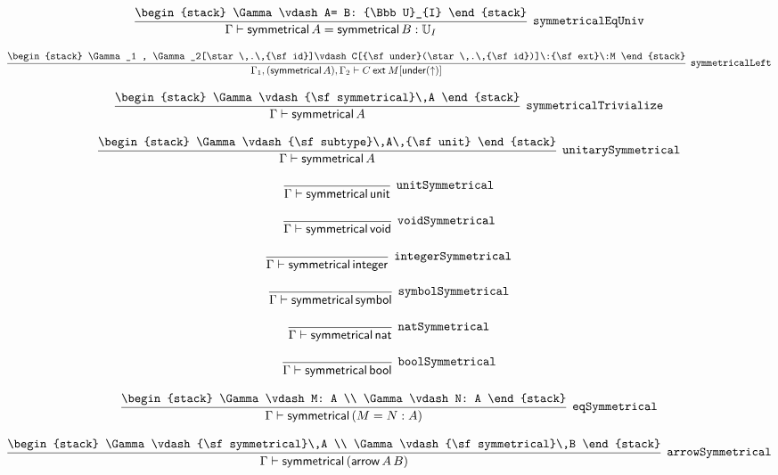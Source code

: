\[
\infer[{\tt symmetricalEqUniv}]{\Gamma \vdash {\sf symmetrical}\,A= {\sf symmetrical}\,B: {\Bbb U}_{I}}{
\begin{stack}
\Gamma \vdash A= B: {\Bbb U}_{I}
\end{stack}}
\]

\[
\infer[{\tt symmetricalLeft}]{\Gamma_1 ,({\sf symmetrical}\,A), \Gamma_2 \vdash C\:{\sf ext}\:M[{\sf under}(\uparrow )]}{
\begin{stack}
\Gamma_1 , \Gamma_2[\star \,.\,{\sf id}]\vdash C[{\sf under}(\star \,.\,{\sf id})]\:{\sf ext}\:M
\end{stack}}
\]

\[
\infer[{\tt symmetricalTrivialize}]{\Gamma \vdash {\sf symmetrical}\,A}{
\begin{stack}
\Gamma \vdash {\sf symmetrical}\,A
\end{stack}}
\]

\[
\infer[{\tt unitarySymmetrical}]{\Gamma \vdash {\sf symmetrical}\,A}{
\begin{stack}
\Gamma \vdash {\sf subtype}\,A\,{\sf unit}
\end{stack}}
\]

\[
\infer[{\tt unitSymmetrical}]{\Gamma \vdash {\sf symmetrical}\,{\sf unit}}{}
\]

\[
\infer[{\tt voidSymmetrical}]{\Gamma \vdash {\sf symmetrical}\,{\sf void}}{}
\]

\[
\infer[{\tt integerSymmetrical}]{\Gamma \vdash {\sf symmetrical}\,{\sf integer}}{}
\]

\[
\infer[{\tt symbolSymmetrical}]{\Gamma \vdash {\sf symmetrical}\,{\sf symbol}}{}
\]

\[
\infer[{\tt natSymmetrical}]{\Gamma \vdash {\sf symmetrical}\,{\sf nat}}{}
\]

\[
\infer[{\tt boolSymmetrical}]{\Gamma \vdash {\sf symmetrical}\,{\sf bool}}{}
\]

\[
\infer[{\tt eqSymmetrical}]{\Gamma \vdash {\sf symmetrical}\,(M= N: A)}{
\begin{stack}
\Gamma \vdash M: A
\\
\Gamma \vdash N: A
\end{stack}}
\]

\[
\infer[{\tt arrowSymmetrical}]{\Gamma \vdash {\sf symmetrical}\,({\sf arrow}\,A\,B)}{
\begin{stack}
\Gamma \vdash {\sf symmetrical}\,A
\\
\Gamma \vdash {\sf symmetrical}\,B
\end{stack}}
\]


